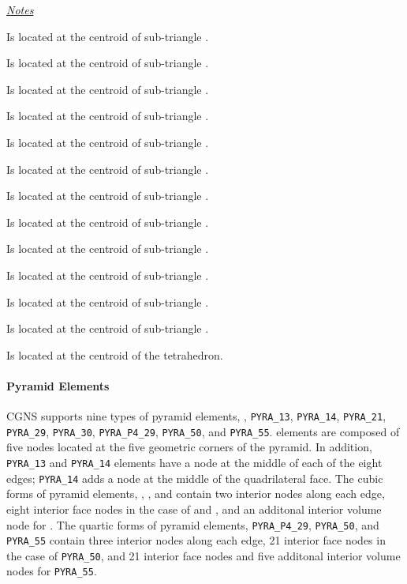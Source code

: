 {{{\bigskip

\uline{\textit{Notes}}%
\begin{Ventryi}{}
   \item [\fort{N23}]
         Is located at the centroid of sub-triangle .
   \item [\fort{N24}]
         Is located at the centroid of sub-triangle .
   \item [\fort{N25}]
         Is located at the centroid of sub-triangle .
   \item [\fort{N26}]
         Is located at the centroid of sub-triangle .
   \item [\fort{N27}]
         Is located at the centroid of sub-triangle .
   \item [\fort{N28}]
         Is located at the centroid of sub-triangle .
   \item [\fort{N29}]
         Is located at the centroid of sub-triangle .
   \item [\fort{N30}]
         Is located at the centroid of sub-triangle .
   \item [\fort{N31}]
         Is located at the centroid of sub-triangle .
   \item [\fort{N32}]
         Is located at the centroid of sub-triangle .
   \item [\fort{N33}]
         Is located at the centroid of sub-triangle .
   \item [\fort{N34}]
         Is located at the centroid of sub-triangle .
   \item [\fort{N35}]
         Is located at the centroid of the tetrahedron.
\end{Ventryi}

\paragraph{Pyramid Elements}
CGNS supports nine types of pyramid elements, ,
\texttt{PYRA\_13}, \texttt{PYRA\_14}, \texttt{PYRA\_21}, \texttt{PYRA\_29}, \texttt{PYRA\_30},
\texttt{PYRA\_P4\_29}, \texttt{PYRA\_50}, and \texttt{PYRA\_55}.
 elements are composed of five nodes located at the
five geometric corners of the pyramid.
In addition, \texttt{PYRA\_13} and \texttt{PYRA\_14} elements have a node
at the middle of each of the eight edges; \texttt{PYRA\_14} adds a node
at the middle of the quadrilateral face.
The cubic forms of pyramid elements, ,
, and 
contain two interior nodes along each edge, eight interior face nodes
in the case of  and , and an additonal
interior volume node for .
The quartic forms of pyramid elements, \texttt{PYRA\_P4\_29}, \texttt{PYRA\_50}, and \texttt{PYRA\_55}
contain three interior nodes along each edge, 21 interior face nodes
in the case of \texttt{PYRA\_50}, and 21 interior face nodes and five additonal
interior volume nodes for \texttt{PYRA\_55}.

}}}
